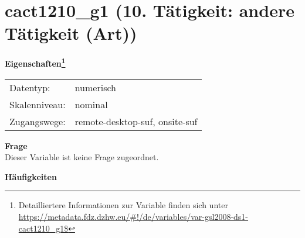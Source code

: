 
    \setcounter{footnote}{0}

    \vspace*{-1.8cm}
	\section{cact1210\_g1 (10. Tätigkeit: andere Tätigkeit (Art))}
	\label{section:cact1210_g1}



    \vspace*{0.5cm}
    \noindent\textbf{Eigenschaften\footnote{Detailliertere Informationen zur Variable finden sich unter
		\url{https://metadata.fdz.dzhw.eu/\#!/de/variables/var-gsl2008-ds1-cact1210_g1$}}}\\
	\begin{tabularx}{\hsize}{@{}lX}
	Datentyp: & numerisch \\
	Skalenniveau: & nominal \\
	Zugangswege: &
	  remote-desktop-suf, 
	  onsite-suf
 \\
    \end{tabularx}



		\vspace*{0.5cm}
		\noindent\textbf{Frage}\\
		Dieser Variable ist keine Frage zugeordnet.





        		\vspace*{0.5cm}
                \noindent\textbf{Häufigkeiten}

